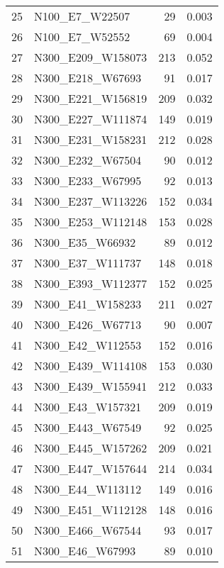 \begin{table}
\begin{tabular}{llrr}
25 &      N100\_E7\_W22507 &    29 &             0.003 \\
26 &      N100\_E7\_W52552 &    69 &             0.004 \\
27 &   N300\_E209\_W158073 &   213 &             0.052 \\
28 &    N300\_E218\_W67693 &    91 &             0.017 \\
29 &   N300\_E221\_W156819 &   209 &             0.032 \\
30 &   N300\_E227\_W111874 &   149 &             0.019 \\
31 &   N300\_E231\_W158231 &   212 &             0.028 \\
32 &    N300\_E232\_W67504 &    90 &             0.012 \\
33 &    N300\_E233\_W67995 &    92 &             0.013 \\
34 &   N300\_E237\_W113226 &   152 &             0.034 \\
35 &   N300\_E253\_W112148 &   153 &             0.028 \\
36 &     N300\_E35\_W66932 &    89 &             0.012 \\
37 &    N300\_E37\_W111737 &   148 &             0.018 \\
38 &   N300\_E393\_W112377 &   152 &             0.025 \\
39 &    N300\_E41\_W158233 &   211 &             0.027 \\
40 &    N300\_E426\_W67713 &    90 &             0.007 \\
41 &    N300\_E42\_W112553 &   152 &             0.016 \\
42 &   N300\_E439\_W114108 &   153 &             0.030 \\
43 &   N300\_E439\_W155941 &   212 &             0.033 \\
44 &    N300\_E43\_W157321 &   209 &             0.019 \\
45 &    N300\_E443\_W67549 &    92 &             0.025 \\
46 &   N300\_E445\_W157262 &   209 &             0.021 \\
47 &   N300\_E447\_W157644 &   214 &             0.034 \\
48 &    N300\_E44\_W113112 &   149 &             0.016 \\
49 &   N300\_E451\_W112128 &   148 &             0.016 \\
50 &    N300\_E466\_W67544 &    93 &             0.017 \\
51 &     N300\_E46\_W67993 &    89 &             0.010 \\

\end{tabular}
\end{table}
